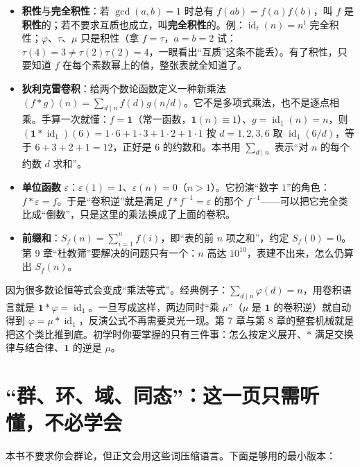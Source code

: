 \documentclass[UTF8,a4paper,11pt,oneside,openany,fontset=fandol]{ctexbook}
\theoremstyle{definition}
\newcommand{\eps}{\varepsilon}
\newcommand{\one}{\mathbf 1}
\newcommand{\id}{\operatorname{id}}
\begin{document}
\begin{itemize}
\item \textbf{积性}与\textbf{完全积性}：若 $\gcd(a,b)=1$ 时总有 $f(ab)=f(a)f(b)$，叫 $f$ 是\textbf{积性}的；若不要求互质也成立，叫\textbf{完全积性}的。例：$\id_t(n)=n^t$ 完全积性；$\varphi$、$\tau$、$\mu$ 只是积性（拿 $f=\tau$，$a=b=2$ 试：$\tau(4)=3\ne\tau(2)\tau(2)=4$，一眼看出“互质”这条不能丢）。有了积性，只要知道 $f$ 在每个素数幂上的值，整张表就全知道了。
\item \textbf{狄利克雷卷积}：给两个数论函数定义一种新乘法
$(f*g)(n)=\sum_{d\mid n}f(d)g(n/d)$。它不是多项式乘法，也不是逐点相乘。手算一次就懂：$f=\one$（常一函数，$\one(n)\equiv1$）、$g=\id_1(n)=n$，则 $(\one*\id_1)(6)=1\cdot6+1\cdot3+1\cdot2+1\cdot1$ 按 $d=1,2,3,6$ 取 $\id_1(6/d)$，等于 $6+3+2+1=12$，正好是 $6$ 的约数和。本书用 $\sum_{d\mid n}$ 表示“对 $n$ 的每个约数 $d$ 求和”。
\item \textbf{单位函数} $\eps$：$\eps(1)=1$、$\eps(n)=0$（$n>1$）。它扮演“数字 $1$”的角色：$f*\eps=f$。于是“卷积逆”就是满足 $f*f^{-1}=\eps$ 的那个 $f^{-1}$——可以把它完全类比成“倒数”，只是这里的乘法换成了上面的卷积。
\item \textbf{前缀和}：$S_f(n)=\sum_{i=1}^{n}f(i)$，即“表的前 $n$ 项之和”，约定 $S_f(0)=0$。第 9 章“杜教筛”要解决的问题只有一个：$n$ 高达 $10^{10}$，表建不出来，怎么仍算出 $S_f(n)$。
\end{itemize}

\begin{tip}
因为很多数论恒等式会变成“乘法等式”。经典例子：$\sum_{d\mid n}\varphi(d)=n$，用卷积语言就是 $\one*\varphi=\id_1$。一旦写成这样，两边同时“乘 $\mu$”（$\mu$ 是 $\one$ 的卷积逆）就自动得到 $\varphi=\mu*\id_1$，反演公式不再需要灵光一现。第 7 章与第 8 章的整套机械就是把这个类比推到底。初学时你要掌握的只有三件事：怎么按定义展开、$*$ 满足交换律与结合律、$\one$ 的逆是 $\mu$。
\end{tip}

\section{“群、环、域、同态”：这一页只需听懂，不必学会}
本书不要求你会群论，但正文会用这些词压缩语言。下面是够用的最小版本：
\end{document}
